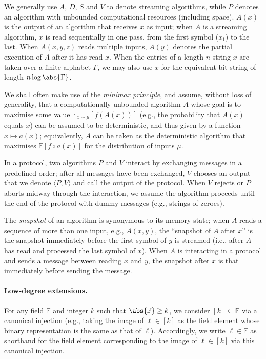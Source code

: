 \documentclass[a4paper,UKenglish,cleveref, autoref, thm-restate]{lipics-v2021}
\theoremstyle{definition}
\newcommand{\E}{\mathbb E}
\newcommand{\field}{\mathbb{F}}
\newcommand{\alphabet}{\Gamma}
\begin{document}
    We generally use $A$, $D$, $S$ and $V$ to denote streaming algorithms, while $P$ denotes an algorithm with unbounded computational resources (including space). $A(x)$ is the output of an algorithm that receives $x$ as input; when $A$ is a streaming algorithm, $x$ is read sequentially in one pass, from the first symbol ($x_1$) to the last. When $A(x, y, z)$ reads multiple inputs, $A(y)$ denotes the partial execution of $A$ after it has read $x$. When the entries of a length-$n$ string $x$ are taken over a finite alphabet $\alphabet$, we may also use $x$ for the equivalent bit string of length $n \log\abs{\alphabet}$.
    
    We shall often make use of the \emph{minimax principle}, and assume, without loss of generality, that a computationally unbounded algorithm $A$ whose goal is to maximise some value $\E_{x \sim \mu}[f(A(x))]$ (e.g., the probability that $A(x)$ equals $x$) can be assumed to be deterministic, and thus given by a function $x \mapsto a(x)$; equivalently, $A$ can be taken as the deterministic algorithm that maximises $\E[f \circ a(x)]$ for the distribution of inputs $\mu$.
    
    In a protocol, two algorithms $P$ and $V$ interact by exchanging messages in a predefined order; after all messages have been exchanged, $V$ chooses an output that we denote $\langle P, V\rangle$ and call the output of the protocol. When $V$ rejects or $P$ aborts midway through the interaction, we assume the algorithm proceeds until the end of the protocol with dummy messages (e.g., strings of zeroes).
    
    The \emph{snapshot} of an algorithm is synonymous to its memory state; when $A$ reads a sequence of more than one input, e.g., $A(x,y)$, the ``snapshot of $A$ after $x$'' is the snapshot immediately before the first symbol of $y$ is streamed (i.e., after $A$ has read and processed the last symbol of $x$). When $A$ is interacting in a protocol and sends a message between reading $x$ and $y$, the snapshot after $x$ is that immediately before sending the message.

    \paragraph*{Low-degree extensions\iflipics\else.\fi} For any field $\field$ and integer $k$ such that $\abs{\field} \geq k$, we consider $[k] \subseteq \field$ via a canonical injection (e.g., taking the image of $\ell \in [k]$ as the field element whose binary representation is the same as that of $\ell$). Accordingly, we write $\ell \in \field$ as shorthand for the field element corresponding to the image of $\ell \in [k]$ via this canonical injection.
    
\end{document}

